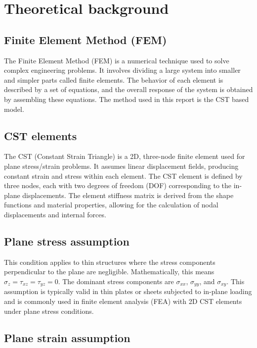 \documentclass{article}  %
\begin{document}
\newpage

\section{Theoretical background}

\subsection{Finite Element Method (FEM)}

The Finite Element Method (FEM) is a numerical technique used to solve complex engineering problems. It involves dividing a large system into smaller and simpler parts called finite elements. The behavior of each element is described by a set of equations, and the overall response of the system is obtained by assembling these equations. The method used in this report is the CST based model.

\subsection{CST elements}

The CST (Constant Strain Triangle) is a 2D, three-node finite element used for plane stress/strain problems.  
It assumes linear displacement fields, producing constant strain and stress within each element. The CST element is defined by three nodes, each with two degrees of freedom (DOF) corresponding to the in-plane displacements. The element stiffness matrix is derived from the shape functions and material properties, allowing for the calculation of nodal displacements and internal forces.

\subsection{Plane stress assumption}

This condition applies to thin structures where the stress components perpendicular to the plane are negligible. Mathematically, this means $\sigma_z = \tau_{xz} = \tau_{yz} = 0$. The dominant stress components are $\sigma_{xx}$, $\sigma_{yy}$, and $\sigma_{xy}$. This assumption is typically valid in thin plates or sheets subjected to in-plane loading and is commonly used in finite element analysis (FEA) with 2D CST elements under plane stress conditions.

\subsection{Plane strain assumption}
\end{document}
